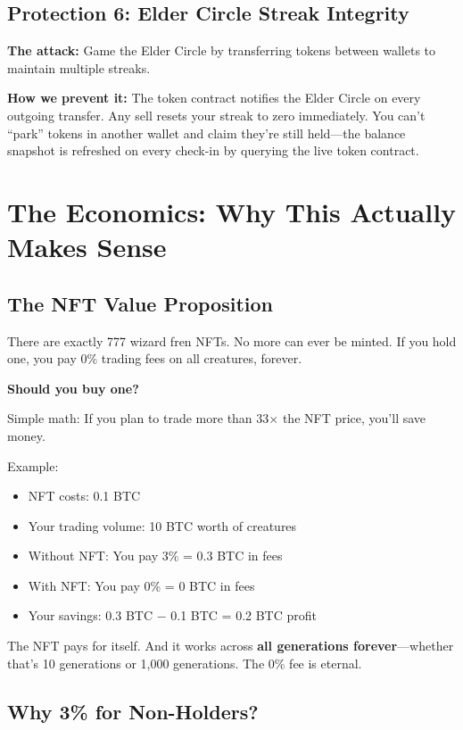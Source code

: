 \documentclass[11pt,a4paper]{article}
\begin{document}
\subsection{Protection 6: Elder Circle Streak Integrity}

\textbf{The attack:} Game the Elder Circle by transferring tokens between wallets to maintain multiple streaks.

\textbf{How we prevent it:} The token contract notifies the Elder Circle on every outgoing transfer. Any sell resets your streak to zero immediately. You can't ``park'' tokens in another wallet and claim they're still held---the balance snapshot is refreshed on every check-in by querying the live token contract.

\section{The Economics: Why This Actually Makes Sense}

\subsection{The NFT Value Proposition}

There are exactly 777 wizard fren NFTs. No more can ever be minted. If you hold one, you pay 0\% trading fees on all creatures, forever.

\textbf{Should you buy one?}

Simple math: If you plan to trade more than 33$\times$ the NFT price, you'll save money.

Example:
\begin{itemize}
    \item NFT costs: 0.1 BTC
    \item Your trading volume: 10 BTC worth of creatures
    \item Without NFT: You pay 3\% = 0.3 BTC in fees
    \item With NFT: You pay 0\% = 0 BTC in fees
    \item Your savings: 0.3 BTC $-$ 0.1 BTC = 0.2 BTC profit
\end{itemize}

The NFT pays for itself. And it works across \textbf{all generations forever}---whether that's 10 generations or 1,000 generations. The 0\% fee is eternal.

\subsection{Why 3\% for Non-Holders?}
\end{document}
